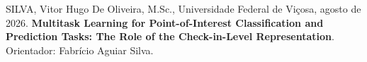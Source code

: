    \begin{resumo}[Resumo]
        \singlespacing
        SILVA, Vitor Hugo De Oliveira, M.Sc., Universidade Federal de Viçosa, agosto de 2026.
        \textbf{Multitask Learning for Point-of-Interest Classification and Prediction Tasks: The Role of the Check-in-Level Representation}. Orientador: Fabrício Aguiar Silva.
        \vspace{\onelineskip}


\end{resumo}
